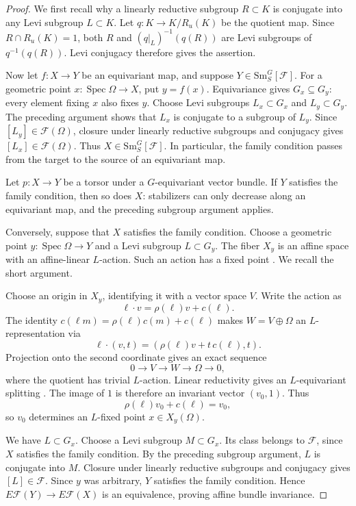 \documentclass[11pt,reqno]{amsart}
\theoremstyle{definition}
\theoremstyle{remark}
\theoremstyle{plain}
\numberwithin{equation}{section}
\newcommand{\Sm}{\mathrm{Sm}}
\newcommand{\F}{\mathcal F}
\begin{document}
\begin{proof}
We first recall why a linearly reductive subgroup \(R\subset K\)
is conjugate into any Levi subgroup \(L\subset K\).
Let \(q:K\to K/R_u(K)\) be the quotient map.
Since \(R\cap R_u(K)=1\), both \(R\) and
\((q|_L)^{-1}(q(R))\) are Levi subgroups of \(q^{-1}(q(R))\).
Levi conjugacy therefore gives the assertion.

Now let \(f:X\to Y\) be an equivariant map, and suppose
\(Y\in\Sm^G_S[\F]\).
For a geometric point \(x:\operatorname{Spec}\Omega\to X\),
put \(y=f(x)\).
Equivariance gives \(G_x\subseteq G_y\): every element fixing
\(x\) also fixes \(y\).
Choose Levi subgroups \(L_x\subset G_x\) and \(L_y\subset G_y\).
The preceding argument shows that \(L_x\) is conjugate to a
subgroup of \(L_y\).
Since \([L_y]\in\F(\Omega)\), closure under linearly reductive
subgroups and conjugacy gives \([L_x]\in\F(\Omega)\).
Thus \(X\in\Sm^G_S[\F]\).
In particular, the family condition passes from the target
to the source of an equivariant map.

Let \(p:X\to Y\) be a torsor under a \(G\)-equivariant vector
bundle. If \(Y\) satisfies the family condition, then so does \(X\):
stabilizers can only decrease along an equivariant map, and the
preceding subgroup argument applies.

Conversely, suppose that \(X\) satisfies the family condition.
Choose a geometric point \(y:\operatorname{Spec}\Omega\to Y\)
and a Levi subgroup \(L\subset G_y\).
The fiber \(X_y\) is an affine space with an affine-linear
\(L\)-action. Such an action has a fixed point
\cite[Corollary~A.8]{ReevesHyperspherical}.
We recall the short argument.

Choose an origin in \(X_y\), identifying it with a vector space \(V\).
Write the action as
\[
 \ell\cdot v=\rho(\ell)v+c(\ell).
\]
The identity
\(c(\ell m)=\rho(\ell)c(m)+c(\ell)\)
makes \(W=V\oplus\Omega\) an \(L\)-representation via
\[
 \ell\cdot(v,t)=(\rho(\ell)v+t\,c(\ell),t).
\]
Projection onto the second coordinate gives an exact sequence
\[
 0\longrightarrow V\longrightarrow W
   \longrightarrow\Omega\longrightarrow0,
\]
where the quotient has trivial \(L\)-action.
Linear reductivity gives an \(L\)-equivariant splitting
\cite[5.14 and 5.18]{MilneReductiveGroups}.
The image of \(1\) is therefore an invariant vector \((v_0,1)\).
Thus
\[
 \rho(\ell)v_0+c(\ell)=v_0,
\]
so \(v_0\) determines an \(L\)-fixed point \(x\in X_y(\Omega)\).

We have \(L\subset G_x\).
Choose a Levi subgroup \(M\subset G_x\).
Its class belongs to \(\mathcal F\), since \(X\) satisfies the
family condition.
By the preceding subgroup argument, \(L\) is conjugate into \(M\).
Closure under linearly reductive subgroups and conjugacy gives
\([L]\in\mathcal F\).
Since \(y\) was arbitrary, \(Y\) satisfies the family condition.
Hence \(E\mathcal F(Y)\to E\mathcal F(X)\) is an equivalence,
proving affine bundle invariance.


\end{proof}
\end{document}
